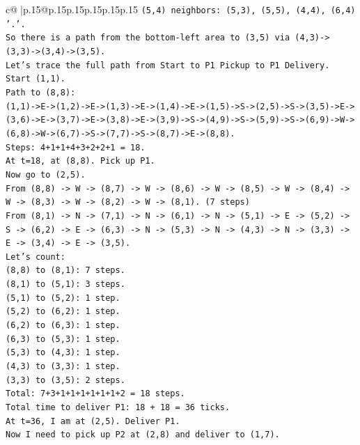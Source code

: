 \documentclass{article}
\begin{document}
{\begin{supertabular}{c@{$\;$}|p{.15\linewidth}@{}p{.15\linewidth}p{.15\linewidth}p{.15\linewidth}p{.15\linewidth}p{.15\linewidth}}
{{{\texttt{(5,4) neighbors: (5,3), (5,5), (4,4), (6,4) '.'.} \\
\texttt{So there is a path from the bottom{-}left area to (3,5) via (4,3){-}>(3,3){-}>(3,4){-}>(3,5).} \\
\texttt{Let's trace the full path from Start to P1 Pickup to P1 Delivery.} \\
\texttt{Start (1,1).} \\
\texttt{Path to (8,8):} \\
\texttt{(1,1){-}>E{-}>(1,2){-}>E{-}>(1,3){-}>E{-}>(1,4){-}>E{-}>(1,5){-}>S{-}>(2,5){-}>S{-}>(3,5){-}>E{-}>(3,6){-}>E{-}>(3,7){-}>E{-}>(3,8){-}>E{-}>(3,9){-}>S{-}>(4,9){-}>S{-}>(5,9){-}>S{-}>(6,9){-}>W{-}>(6,8){-}>W{-}>(6,7){-}>S{-}>(7,7){-}>S{-}>(8,7){-}>E{-}>(8,8).} \\
\texttt{Steps: 4+1+1+4+3+2+2+1 = 18.} \\
\texttt{At t=18, at (8,8). Pick up P1.} \\
\texttt{Now go to (2,5).} \\
\texttt{From (8,8) {-}> W {-}> (8,7) {-}> W {-}> (8,6) {-}> W {-}> (8,5) {-}> W {-}> (8,4) {-}> W {-}> (8,3) {-}> W {-}> (8,2) {-}> W {-}> (8,1). (7 steps)} \\
\texttt{From (8,1) {-}> N {-}> (7,1) {-}> N {-}> (6,1) {-}> N {-}> (5,1) {-}> E {-}> (5,2) {-}> S {-}> (6,2) {-}> E {-}> (6,3) {-}> N {-}> (5,3) {-}> N {-}> (4,3) {-}> N {-}> (3,3) {-}> E {-}> (3,4) {-}> E {-}> (3,5).} \\
\texttt{Let's count:} \\
\texttt{(8,8) to (8,1): 7 steps.} \\
\texttt{(8,1) to (5,1): 3 steps.} \\
\texttt{(5,1) to (5,2): 1 step.} \\
\texttt{(5,2) to (6,2): 1 step.} \\
\texttt{(6,2) to (6,3): 1 step.} \\
\texttt{(6,3) to (5,3): 1 step.} \\
\texttt{(5,3) to (4,3): 1 step.} \\
\texttt{(4,3) to (3,3): 1 step.} \\
\texttt{(3,3) to (3,5): 2 steps.} \\
\texttt{Total: 7+3+1+1+1+1+1+1+2 = 18 steps.} \\
\texttt{Total time to deliver P1: 18 + 18 = 36 ticks.} \\
\texttt{At t=36, I am at (2,5). Deliver P1.} \\
\texttt{Now I need to pick up P2 at (2,8) and deliver to (1,7).} \\
}}}
\end{supertabular}}
\end{document}
